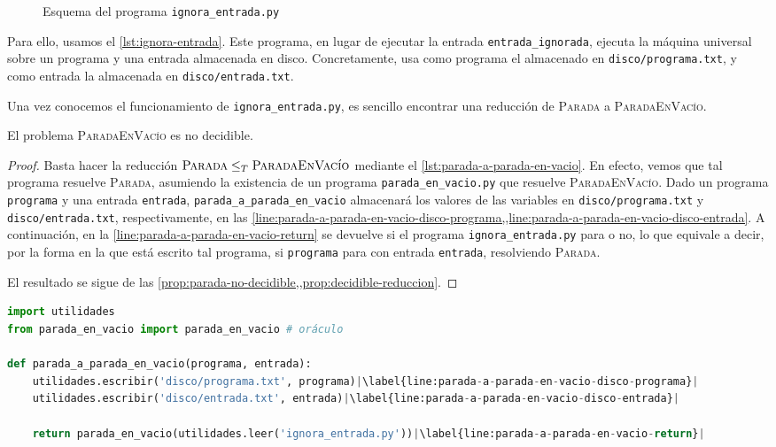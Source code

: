 \begin{figure}[H]
\centering

\caption{Esquema del programa \texttt{ignora\_entrada.py}}
\label{fig:ignora-entrada}
\end{figure}

Para ello, usamos el \cref{lst:ignora-entrada}. Este programa, en lugar de ejecutar la entrada \linebreak\texttt{entrada\_ignorada}, ejecuta la máquina universal sobre un programa y una entrada almacenada en disco. Concretamente, usa como programa el almacenado en \texttt{disco/programa.txt}, y como entrada la almacenada en \texttt{disco/entrada.txt}.

Una vez conocemos el funcionamiento de \texttt{ignora\_entrada.py}, es sencillo encontrar una reducción de \textsc{Parada} a \textsc{ParadaEnVacío}.

\begin{proposicion}\label{prop:parada-en-vacio-no-decidible}
El problema \textsc{ParadaEnVacío} es no decidible.
\end{proposicion}
\begin{proof}
Basta hacer la reducción $\textsc{Parada}\leq_T\textsc{ParadaEnVacío}$ mediante el \cref{lst:parada-a-parada-en-vacio}. En efecto, vemos que tal programa resuelve \textsc{Parada}, asumiendo la existencia de un programa \texttt{parada\_en\_vacio.py} que resuelve \textsc{ParadaEnVacío}. Dado un programa \texttt{programa} y una entrada \texttt{entrada}, \texttt{parada\_a\_parada\_en\_vacio} almacenará los valores de las variables en \texttt{disco/programa.txt} y \texttt{disco/entrada.txt}, respectivamente, en las \cref{line:parada-a-parada-en-vacio-disco-programa,,line:parada-a-parada-en-vacio-disco-entrada}. A continuación, en la \cref{line:parada-a-parada-en-vacio-return} se devuelve si el programa \texttt{ignora\_entrada.py} para o no, lo que equivale a decir, por la forma en la que está escrito tal programa, si \texttt{programa} para con entrada \texttt{entrada}, resolviendo \textsc{Parada}.

El resultado se sigue de las \cref{prop:parada-no-decidible,,prop:decidible-reduccion}.
\end{proof}

\begin{lstlisting}[language=Python, caption=\lstinline{parada_a_parada_en_vacio.py},label={lst:parada-a-parada-en-vacio}]
import utilidades
from parada_en_vacio import parada_en_vacio # oráculo

def parada_a_parada_en_vacio(programa, entrada):
    utilidades.escribir('disco/programa.txt', programa)|\label{line:parada-a-parada-en-vacio-disco-programa}|
    utilidades.escribir('disco/entrada.txt', entrada)|\label{line:parada-a-parada-en-vacio-disco-entrada}|

    return parada_en_vacio(utilidades.leer('ignora_entrada.py'))|\label{line:parada-a-parada-en-vacio-return}|
\end{lstlisting}

